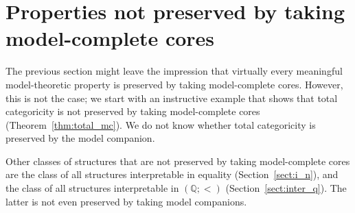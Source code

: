 \documentclass{amsart}
\theoremstyle{definition}
\theoremstyle{remark}
\numberwithin{equation}{section}
\begin{document}

\section{Properties not preserved by taking model-complete cores}\label{sec:notpreserved}
The previous section might leave the impression that virtually every meaningful model-theoretic property
is preserved by taking model-complete cores. However, this is not the case; we start with an instructive example that shows that total categoricity is not preserved by taking model-complete cores (Theorem~\ref{thm:total_mc}). We do not know whether total categoricity is preserved by the model companion.

Other classes of structures that are not preserved by taking model-complete cores are the class of all structures interpretable in  equality (Section~\ref{sect:i_n}), and the class of all structures interpretable in  $({\mathbb Q};<)$ (Section~\ref{sect:inter_q}). The latter is not even preserved by taking model companions.
\end{document}

